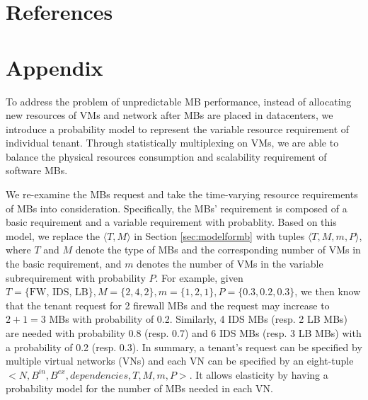 \documentclass[review]{elsarticle}
\begin{document}
 






%
%
\section*{References}

\appendix
\section*{Appendix}
To address the problem of unpredictable MB performance, instead of allocating new resources of VMs and network after MBs are placed in datacenters, we introduce a probability model to represent the variable resource requirement of individual tenant. Through statistically multiplexing on VMs, we are able to balance the physical resources consumption and scalability requirement of software MBs. 

We re-examine the MBs request and take the time-varying resource requirements of MBs into consideration. Specifically, the MBs' requirement is composed of a basic requirement and a variable requirement with probablity. Based on this model, we replace the $\langle T, M \rangle$ in Section \ref{sec:modelformb} with tuples $\langle T, M, m, P\rangle$, where $T$ and $M$  denote the type of MBs and the corresponding number of VMs in the basic requirement, and $m$ denotes the number of VMs in the variable subrequirement with probability $P$. For example, given $T=\{\text{FW, IDS, LB}\}, M=\{ 2, 4, 2\}, m=\{1, 2, 1\}, P=\{0.3, 0.2, 0.3\}$, we then know that the tenant request for 2 firewall MBs and the request may increase to $2+1=3$ MBs with probability of 0.2. Similarly, 4 IDS MBs (resp. 2 LB MBs) are needed with probability 0.8 (resp. 0.7) and 6 IDS MBs (resp. 3 LB MBs) with a probability of 0.2 (resp. 0.3). In summary, a tenant's request can be specified by multiple virtual networks (VNs) and each VN can be specified by an eight-tuple $<N, B^{in}, B^{ex}, dependencies, T, M, m, P>$. It allows elasticity by having a probability model for the number of MBs needed in each VN.
\end{document}
